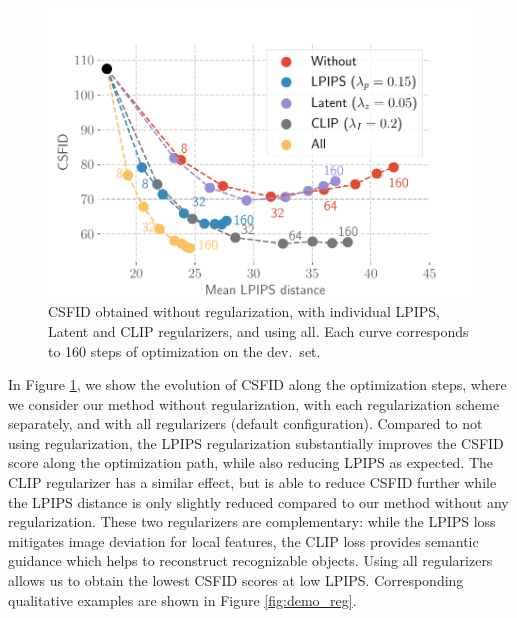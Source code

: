 \begin{figure}
    \centering
    \vspace{-1em}
    \includegraphics[width=\linewidth]{images/flexit/assets/reg_evol.pdf}
    \caption{CSFID obtained without regularization, with individual LPIPS, Latent and CLIP regularizers, and using all. 
    Each curve corresponds to 160 steps of optimization on the dev.\ set. 
    }
    \label{fig:regul}
\end{figure}

In Figure \ref{fig:regul}, we show the evolution of CSFID along the optimization steps, 
where we consider our method without regularization, with each regularization scheme 
separately, and with all regularizers (default configuration).
Compared to not using regularization, the LPIPS regularization substantially improves
 the CSFID score along the optimization path, while also reducing LPIPS as expected. 
The CLIP regularizer has a similar effect, but is able to reduce  CSFID further while
 the LPIPS distance is only slightly reduced compared to our method without any 
 regularization.
These two regularizers are complementary: while the LPIPS loss mitigates image 
deviation for local features, the CLIP loss provides semantic guidance which helps to 
reconstruct recognizable objects. %
Using all regularizers allows us to obtain the lowest CSFID scores at low LPIPS. 
Corresponding qualitative examples are shown in Figure \ref{fig:demo_reg}. 


